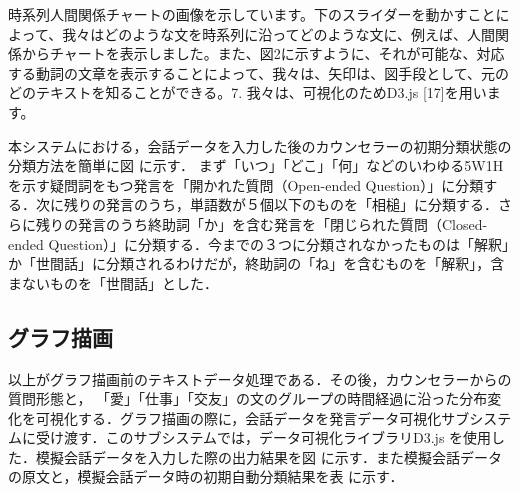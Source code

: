 \documentclass[shuuron]{kuee}
\begin{document}

時系列人間関係チャートの画像を示しています。下のスライダーを動かすことによって、我々はどのような文を時系列に沿ってどのような文に、例えば、人間関係からチャートを表示しました。また、図2に示すように、それが可能な、対応する動詞の文章を表示することによって、我々は、矢印は、図手段として、元のどのテキストを知ることができる。7. 我々は、可視化のためD3.js [17]を用います。



本システムにおける，会話データを入力した後のカウンセラーの初期分類状態の分類方法を簡単に図
に示す．
まず「いつ」「どこ」「何」などのいわゆる5W1Hを示す疑問詞をもつ発言を「開かれた質問（Open-ended Question）」に分類する．次に残りの発言のうち，単語数が５個以下のものを「相槌」に分類する．さらに残りの発言のうち終助詞「か」を含む発言を「閉じられた質問（Closed-ended Question）」に分類する．今までの３つに分類されなかったものは「解釈」か「世間話」に分類されるわけだが，終助詞の「ね」を含むものを「解釈」，含まないものを「世間話」とした．

\subsection{グラフ描画}
以上がグラフ描画前のテキストデータ処理である．その後，カウンセラーからの質問形態と， 「愛」「仕事」「交友」の文のグループの時間経過に沿った分布変化を可視化する．グラフ描画の際に，会話データを発言データ可視化サブシステムに受け渡す．このサブシステムでは，データ可視化ライブラリD3.js
を使用した．模擬会話データを入力した際の出力結果を図
に示す．また模擬会話データの原文と，模擬会話データ時の初期自動分類結果を表
に示す．
%
\end{document}
